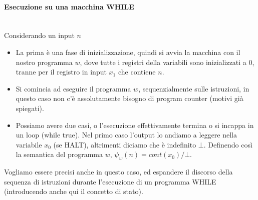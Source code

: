 \documentclass{article}
\begin{document}
\paragraph{Esecuzione su una macchina WHILE}\mbox{}\\
Considerando un input $n$
\begin{itemize}
    \item La prima è una fase di inizializzazione, quindi si avvia la macchina con il nostro
          programma $w$, dove tutte i registri della variabili sono inizializzati a 0, tranne per il registro
          in input $x_1$ che contiene $n$.

    \item Si comincia ad eseguire il programma $w$, sequenzialmente sulle istruzioni, in questo caso non
          c'è assolutamente bisogno di program counter (motivi già spiegati).

    \item Possiamo avere due casi, o l'esecuzione effettivamente termina o si incappa in un loop (while true).
          Nel primo caso l'output lo andiamo a leggere nella variabile $x_0$ (se HALT), altrimenti diciamo che è indefinito
          $\bot$. Definendo così la semantica del programma $w$, $\psi_w(n)=cont(x_0)/\bot$.
\end{itemize}
Vogliamo essere precisi anche in questo caso, ed espandere il discorso della sequenza di istruzioni durante l'esecuzione
di un programma WHILE (introducendo anche qui il concetto di stato).
\end{document}
